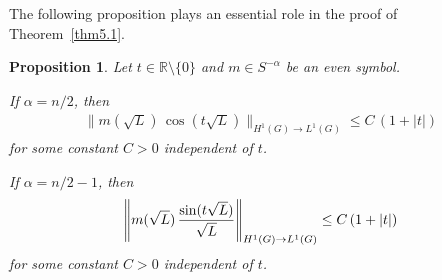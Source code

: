 \documentclass[a4paper,12pt]{amsart}
\numberwithin{equation}{section}
\newtheorem{proposition}[theorem]{Proposition}
\theoremstyle{definition}
\theoremstyle{remark}
\numberwithin{theorem}{section}
\newcommand{\R}{\mathbb{R}}
\begin{document}
The following proposition plays an essential role in the proof of Theorem~\ref{thm5.1}. 
\begin{proposition}\label{prop5.2}
Let $t\in\R\setminus\{0\}$ and $m\in S^{-\alpha}$ be an even symbol.
\begin{asparaenum}[\rm (a)]
\item If $\alpha=n/2$, then
\begin{align*}
\|m(\sqrt{L})\,\cos(t\sqrt{L})\|_{H^1(G)\to L^1(G)}\leq C\,(1+|t|) 
\end{align*}
for some constant $C>0$ independent of $t$.
\item If $\alpha=n/2-1$, then
\begin{align*}
\left\|m(\sqrt{L})\,{\sin(t\sqrt{L})\over \sqrt{L}}\right\|_{H^1(G)\to L^1(G)}\leq C\,(1+|t|) 
\end{align*}
for some constant $C>0$ independent of $t$.
\end{asparaenum}
\end{proposition}
\end{document}
